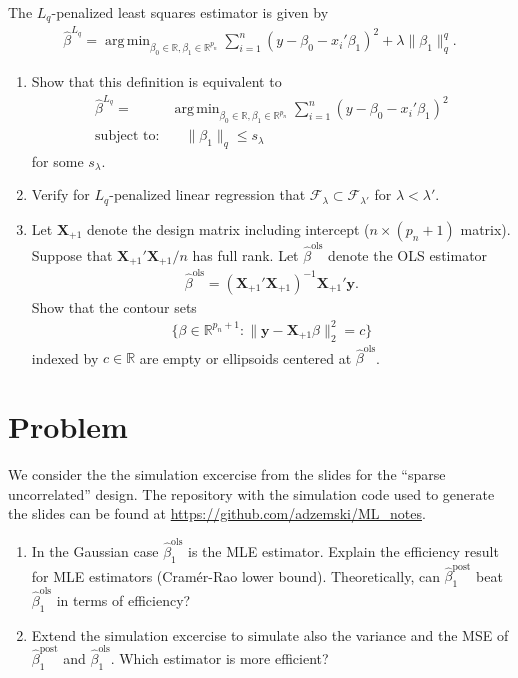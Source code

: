 \documentclass[a4paper]{scrartcl}
\DeclareMathOperator{\argmin}{arg\,min}
\begin{document}
The $L_q$-penalized least squares estimator is given by 
\begin{align*}
	\hat{\beta}^{L_q} = \argmin_{\beta_0 \in \mathbb{R}, \beta_1 \in \mathbb{R}^{p_n}} \sum_{i=1}^n \left(y - \beta_0 - x_i'\beta_1\right)^2 + \lambda \lVert \beta_1 \rVert_q^q. 
\end{align*}
\begin{enumerate}
	\item Show that this definition is equivalent to 
	\begin{align*}
		\hat{\beta}^{L_q} =& \argmin_{\beta_0 \in \mathbb{R}, \beta_1 \in \mathbb{R}^{p_n}} \sum_{i=1}^n \left(y - \beta_0 - x_i'\beta_1\right)^2
	\\
		\text{subject to:} & \quad  \lVert \beta_1 \rVert_q \leq s_{\lambda}
	\end{align*}
	for some $s_{\lambda}$.
	\item Verify for $L_q$-penalized linear regression that $\mathcal{F}_{\lambda} \subset \mathcal{F}_{\lambda'}$ for $\lambda < \lambda'$. 
	\item Let $\mathbf{X}_{+1}$ denote the design matrix including intercept ($n \times (p_n + 1)$ matrix). Suppose that $\mathbf{X}_{+1}'\mathbf{X}_{+1}/n$ has full rank. Let $\hat{\beta}^{\text{ols}}$ denote the OLS estimator 
	\begin{align*}
		\hat{\beta}^{\text{ols}} = \left(\mathbf{X}_{+1}'\mathbf{X}_{+1} \right)^{-1} \mathbf{X}_{+1}' \mathbf{y}.
	\end{align*}
	Show that the contour sets 
	\begin{align*}
		\big\{
	  		\beta \in \mathbb{R}^{p_n + 1} : \lVert \mathbf{y} - \mathbf{X}_{+1} \beta \rVert_2^2 = c 
		\big\}
	\end{align*}
	indexed by $c \in \mathbb{R}$ are empty or ellipsoids centered at $\hat{\beta}^{\text{ols}}$.
\end{enumerate}

\section*{Problem~}

We consider the the simulation excercise from the slides for the ``sparse uncorrelated'' design. The repository with the simulation code used to generate the slides can be found at \url{https://github.com/adzemski/ML_notes}.

\begin{enumerate}
	\item In the Gaussian case $\hat{\beta}_1^{\text{ols}}$ is the MLE estimator. Explain the efficiency result for MLE estimators (Cram\'er-Rao lower bound). Theoretically, can $\hat{\beta}_1^{\text{post}}$ beat $\hat{\beta}_1^{\text{ols}}$ in terms of efficiency?
	\item 
	Extend the simulation excercise to simulate also the variance and the MSE of $\hat{\beta}_1^{\text{post}}$ and $\hat{\beta}_1^{\text{ols}}$. Which estimator is more efficient?
\end{enumerate}
\end{document}
